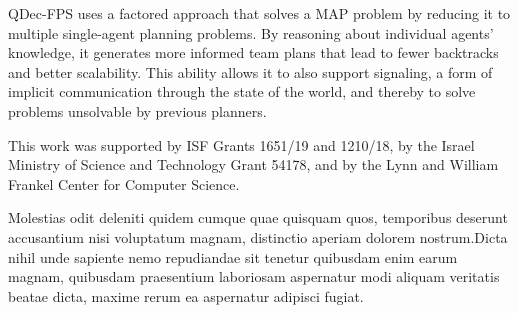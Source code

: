 \documentclass[letterpaper]{article} %
\theoremstyle{definition}
\begin{document}
QDec-FPS uses a
 factored approach that solves a MAP problem
 by reducing it to multiple single-agent planning problems. By
reasoning about individual agents' knowledge, it generates more informed team plans that
lead to fewer backtracks and better scalability. This ability
allows it to also
support signaling, a form of
implicit communication
through the state of the world,
and thereby to solve
problems unsolvable by previous planners.

  This work was supported by ISF Grants 1651/19 and 1210/18, by the Israel Ministry of Science and Technology Grant 54178, and by the Lynn and William Frankel Center for Computer Science.

Molestias odit deleniti quidem cumque quae quisquam quos, temporibus deserunt accusantium nisi voluptatum magnam, distinctio aperiam dolorem nostrum.Dicta nihil unde sapiente nemo repudiandae sit tenetur quibusdam enim earum magnam, quibusdam praesentium laboriosam aspernatur modi aliquam veritatis beatae dicta, maxime rerum ea aspernatur adipisci fugiat.\clearpage

\end{document}
